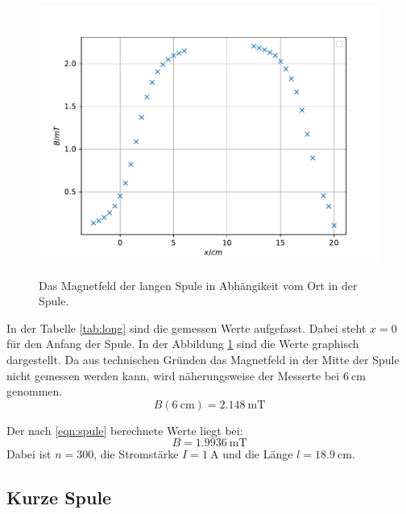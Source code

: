 \begin{figure}
  \centering
  \caption{Das Magnetfeld der langen Spule in Abhängikeit vom Ort in der Spule.}
  \includegraphics[width=\textwidth]{content/data/plot_long.pdf}
  \label{fig:long}
\end{figure}

\FloatBarrier
\noindent
In der Tabelle \ref{tab:long} sind die gemessen Werte aufgefasst.
Dabei steht $x=0$ für den Anfang der Spule.
In der Abbildung \ref{fig:long} sind die Werte graphisch dargestellt.
Da aus technischen Gründen das Magnetfeld in der Mitte der Spule nicht gemessen werden kann, wird näherungsweise der Messerte bei $\SI{6}{\centi\meter}$ genommen.
\begin{equation*}
  B(\SI{6}{\centi\meter}) = \SI{2.148}{\milli\tesla} 
\end{equation*}

Der nach \eqref{eqn:spule} berechnete Werte liegt bei:
\begin{equation*}
  B = \SI{1.9936}{\milli\tesla} 
\end{equation*}
Dabei ist $n=300$, die Stromstärke $I=\SI{1}{\ampere}$ und die Länge $l=\SI{18.9}{\centi\meter}$.

\FloatBarrier
\subsection{Kurze Spule}

